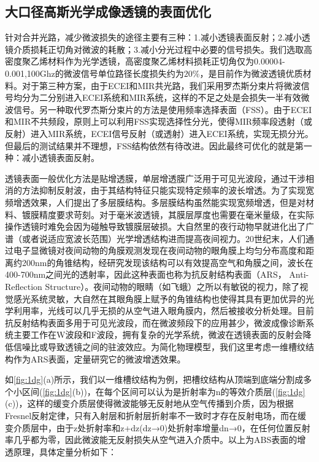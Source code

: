 \subsection{大口径高斯光学成像透镜的表面优化}
针对合并光路，减少微波损失的途径主要有三种：1.减小透镜表面反射；2.减小透镜介质损耗正切角对微波的耗散；3.减小分光过程中必要的信号损失。我们选取高密度聚乙烯材料作为光学透镜，高密度聚乙烯材料损耗正切角仅为0.00004-0.001,100Ghz的微波信号单位路径长度损失约为$20\%$，是目前作为微波透镜优质材料。对于第三种方案，由于ECEI和MIR共光路，我们采用罗杰斯分束片将微波信号均分为二分别进入ECEI系统和MIR系统，这样的不足之处是会损失一半有效微波信号。另一种取代罗杰斯分束片的方法是使用频率选择表面（FSS）。由于ECEI和MIR不共频段，原则上可以利用FSS实现选择性分光，使得MIR频率段透射（或反射）进入MIR系统，ECEI信号反射（或透射）进入ECEI系统，实现无损分光。但最后的测试结果并不理想，FSS结构依然有待改进。因此最终可优化的就是第一种：减小透镜表面反射。
\par 透镜表面一般优化方法是贴增透膜，单层增透膜广泛用于可见光波段，通过干涉相消的方法抑制反射波，由于其结构特征只能实现特定频率的波长增透。为了实现宽频增透效果，人们提出了多层膜结构\cite{RN2059}。多层膜结构虽然能实现宽频增透，但是对材料、镀膜精度要求苛刻。对于毫米波透镜，其膜层厚度也需要在毫米量级，在实际操作透镜时难免会因为碰触导致镀膜层破损。大自然里的夜行动物早就进化出了广谱（或者说适应宽波长范围）光学增透结构进而提高夜间视力。20世纪末，人们通过电子显微镜对夜间动物的角膜观测发现在夜间动物的眼角膜上均匀分布高度和距离约200nm的角锥结构\cite{RN693}，经研究发现该结构可以有效提高空气和角膜之间，波长在400-700nm之间光的透射率，因此这种表面也称为抗反射结构表面（ARS， Anti-Reflection Structure）。夜间动物的眼睛（如飞蛾）之所以有敏锐的视力，除了视觉感光系统灵敏，大自然在其眼角膜上赋予的角锥结构也使得其具有更加优异的光学利用率，光线可以几乎无损的从空气进入眼角膜内，然后被接收分析处理。目前抗反射结构表面多用于可见光波段，而在微波频段下的应用甚少，微波成像诊断系统主要工作在W波段和F波段，拥有复杂的光学系统，微波在透镜表面的反射会降低信噪比或导致透镜之间的驻波效应。为简化物理模型，我们这里考虑一维槽纹结构作为ARS表面，定量研究它的微波增透效果。\par
如\autoref{fig:1dg}(a)所示，我们以一维槽纹结构为例，把槽纹结构从顶端到底端分割成多个小区间(\autoref{fig:1dg}(b))，在每个区间可以认为是折射率为n的等效介质层(\autoref{fig:1dg}(c))，这样的缓变介质层使得微波能够无反射地从空气传播到介质，因为根据Fresnel反射定律，只有入射层和折射层折射率不一致时才存在反射电场，而在缓变介质层中，由于z处折射率和z+dz(dz→0)处折射率增量dn→0，在任何位置反射率几乎都为零，因此微波能无反射损失从空气进入介质中。以上为ABS表面的增透原理，具体定量分析如下：\par
